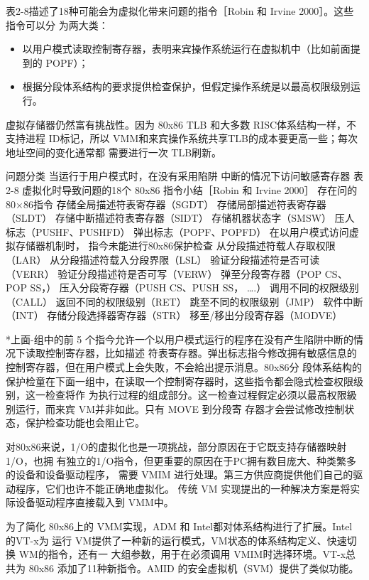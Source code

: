 表2-8描述了18种可能会为虚拟化带来问题的指令［Robin 和 Irvine 2000］。这些指令可以分
为两大类：

\begin{itemize}
    \item 以用户模式读取控制寄存器，表明来宾操作系统运行在虚拟机中（比如前面提到的 POPF）；
    \item 根据分段体系结构的要求提供检查保护，但假定操作系统是以最高权限级别运行。
\end{itemize}

虚拟存储器仍然富有挑战性。因为 80x86 TLB 和大多数 RISC体系结构一样，不支持进程
ID标记，所以 VMM和来宾操作系统共享TLB的成本要更高一些；每次地址空间的变化通常都
需要进行一次 TLB刷新。

问题分类
当运行于用户模式时，在没有采用陷阱
中断的情况下访问敏感寄存器
表2-8 虚拟化时导致问题的18个 80x86 指令小结［Robin 和 Irvine 2000］
存在问的80×86指令
存储全局描述符表寄存器（SGDT）
存储局部描述符表寄存器（SLDT）
存储中断描述符表寄存器（SIDT）
存储机器状态字（SMSW）
压人标志（PUSHF、PUSHFD）
弹出标志（POPF、POPFD）
在以用户模式访问虚拟存储器机制时，
指今未能进行80x86保护检查
从分段描述符载人存取权限（LAR）
从分段描述符载入分段界限（LSL）
验证分段描述符是否可读（VERR）
验证分段描述符是否可写（VERW）
弹至分段寄存器（POP CS、POP SS，）
压入分段寄存器（PUSH CS、PUSH SS， ….）
调用不同的权限级别（CALL）
返回不同的权限级别（RET）
跳至不同的权限级别（JMP）
软件中断（INT）
存储分段选择器寄存器（STR）
移至/移出分段寄存器（MODVE）

*上面-组中的前 5 个指今允许一个以用户模式运行的程序在没有产生陷阱中断的情况下读取控制寄存器，比如描述
符表寄存器。弹出标志指今修改拥有敏感信息的控制寄存器，但在用户模式上会失敗，不会給出提示消息。80x86分
段体系结构的保护检童在下面一组中，在读取一个控制寄存器时，这些指令都会隐式检查权限级别，这一检查将作
为执行过程的组成部分。这一检查过程假定必须以最高权限級别运行，而来宾 VM并非如此。只有 MOVE 到分段寄
存器才会尝试修改控制状态，保护检查功能也会阻止它。

对80x86来说，1/O的虚拟化也是一项挑战，部分原因在于它既支持存储器映射1/O，也拥
有独立的1/O指令，但更重要的原因在于PC拥有数目庞大、种类繁多的设备和设备驱动程序，
需要 VMIM 进行处理。第三方供应商提供他们自己的驱动程序，它们也许不能正确地虚拟化。
传统 VM 实现提出的一种解决方案是将实际设备驱动程序直接载入到 VMM中。

为了简化 80x86上的 VMM实现，ADM 和 Intel都对体系结构进行了扩展。Intel 的VT-x为
运行 VM提供了一种新的运行模式，VM状态的体系结构定义、快速切换 WM的指令，还有一
大组参数，用于在必须调用 VMIM时选择环境。VT-x总共为 80x86 添加了11种新指令。AMID
的安全虚拟机（SVM）提供了类似功能。


